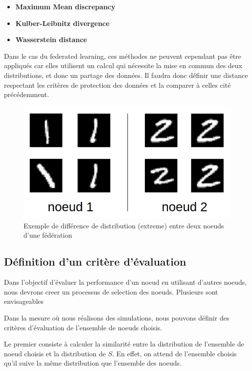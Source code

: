 \documentclass[stage3a]{tnreport} %
\begin{document}
\begin{itemize}
  \item \textbf{Maximum Mean discrepancy}
  \item \textbf{Kulber-Leibnitz divergence}
  \item \textbf{Wasserstein distance}
\end{itemize}

Dans le cas du federated learning, ces méthodes ne peuvent cependant pas être appliqués car elles utilisent un calcul qui nécessite la mise en commun des deux distributions, et donc un partage des données.  Il faudra donc définir une distance respectant les critères de protection des données et la comparer à celles cité précédemment.

\begin{figure}[]
  \centering
  \includegraphics[scale=1.8]{figures/node_divergence.png}
  \caption{Exemple de différence de distribution (extreme) entre deux noeuds d'une fédération}
  \label{fig:imbalence}
\end{figure}

\subsection{Définition d'un critère d'évaluation}

Dans l'objectif d'évaluer la performance d'un noeud en utilisant d'autres noeuds, nous devrons creer un processus de selection des noeuds. Plusieurs sont envisageables

Dans la mesure où nous réalisons des simulations, nous pouvons définir des critères d'évaluation de l'ensemble de noeuds choisis.

Le premier consiste à calculer la similarité entre la distribution de l'ensemble de noeud choisis et la distribution de $S$. En effet, on attend de l'ensemble choisis qu'il suive la même distribution que l'ensemble des noeuds. 
\end{document}
